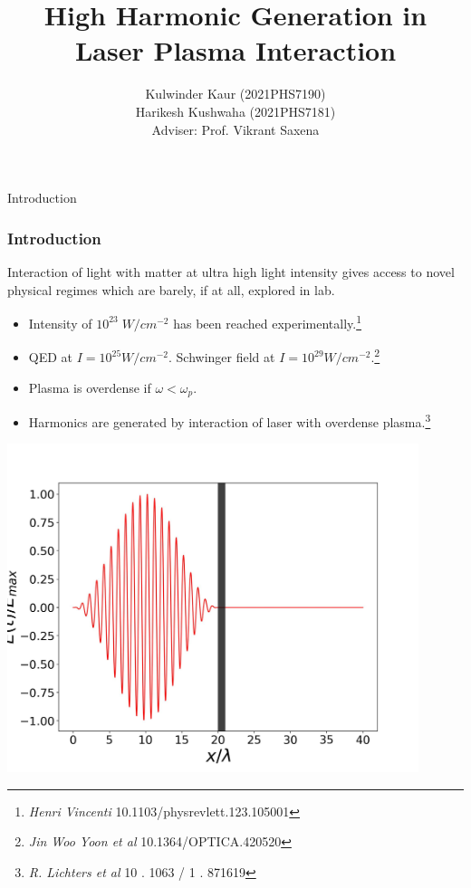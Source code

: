 \documentclass{beamer}
\title[High Harmonic Generation]{High Harmonic Generation in Laser Plasma Interaction}
\date{}
\institute[IIT Delhi]{\large Indian Institute of Technology, Delhi}
\author[]{Kulwinder Kaur (2021PHS7190)\\ Harikesh Kushwaha (2021PHS7181)\\[3mm]Adviser: Prof. Vikrant Saxena}
\begin{document}
\maketitle

\begin{frame}{Introduction}
    \frametitle{Introduction}
    \small
    Interaction of light with matter at ultra high light intensity gives access to novel physical regimes which are barely, if at all, explored in lab.
    \begin{itemize}
        \item Intensity of $10^{23} \; W/cm^{-2}$ has been reached experimentally.\footnote{\textit{Henri Vincenti} 10.1103/physrevlett.123.105001}
        \item QED at $I = 10^{25}W/cm^{-2}$. Schwinger field at $I = 10^{29}W/cm^{-2}$.\footnote{\textit{Jin Woo Yoon et al} 10.1364/OPTICA.420520}
        \item Plasma is overdense if $\omega<\omega_p$.
        \item Harmonics are generated by interaction of laser with overdense plasma.\footnote{\textit{R. Lichters et al} 10 . 1063 / 1 . 871619}
    \end{itemize}
    \begin{minipage}[h]{0.48\linewidth}
        \centering
        \includegraphics[width=0.9\textwidth, height=0.42\textheight]{images/field.jpg}
        \label{fig:field}
    \end{minipage}
    \begin{minipage}[h]{0.48\linewidth}
        \begin{figure}
            \centering

\end{figure}
\end{minipage}
\end{frame}
\end{document}
